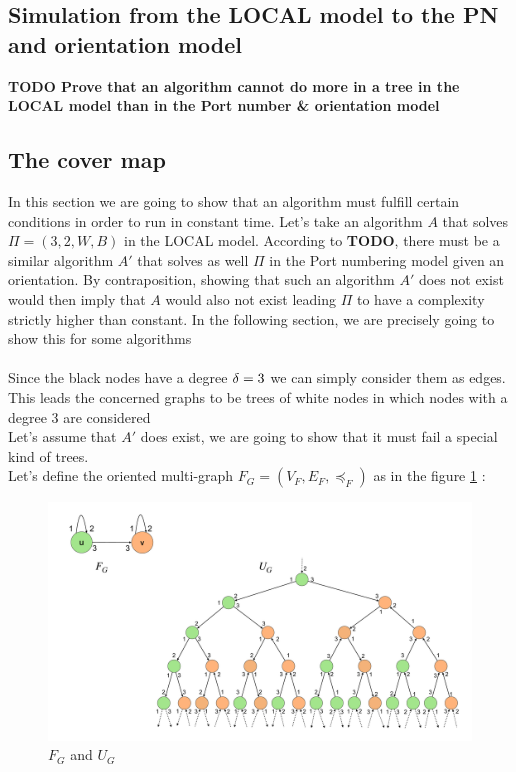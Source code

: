 \subsection{Simulation from the LOCAL model to the PN and orientation model}
\textbf{TODO Prove that an algorithm cannot do more in a tree in the LOCAL model than in the Port number \& orientation model}\\
\subsection{The cover map}
In this section we are going to show that an algorithm must fulfill certain conditions in order to run in constant time.
Let's take an algorithm $A$ that solves $\Pi = (3,2,W,B)$ in the LOCAL model. According to \textbf{TODO}, there must be a similar algorithm $A'$ that solves as well $\Pi$ in the Port numbering model given an orientation. By contraposition, showing that such an algorithm $A'$ does not exist would then imply that $A$ would also not exist leading $\Pi$ to have a complexity strictly higher than constant.
In the following section, we are precisely going to show this for some algorithms\\\\

Since the black nodes have a degree $\delta = 3$ we can simply consider them as edges. This leads the concerned graphs to be trees of white nodes in which nodes with a degree 3 are considered\\
Let's assume that $A'$ does exist, we are going to show that it must fail a special kind of trees.\\
Let's define the oriented multi-graph $F_G = (V_F, E_F,\preceq_F)$ as in the figure \ref{fig:cv1} :\\
\begin{figure}[htb]
    \centering
    \includegraphics[scale = 0.22]{Figures/cover.pdf}
    \caption{$F_G$ and $U_G$}
    \label{fig:cv1}
\end{figure}


